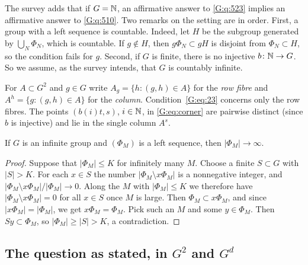 The survey adds that if $G=\mathbb{N}$, an affirmative answer to \cref{G:q:523} implies an
affirmative answer to \cref{G:q:510}. Two remarks on the setting are in order. First, a
group with a left \Fol{} sequence is countable. Indeed, let $H$ be the subgroup generated by
$\bigcup_N\Phi_N$, which is countable. If $g\notin H$, then $g\Phi_N\subset gH$ is disjoint
from $\Phi_N\subset H$, so the \Fol{} condition fails for $g$. Second, if $G$ is finite,
there is no injective $b\colon\mathbb{N}\to G$. So we assume, as the survey intends, that $G$ is
countably infinite.

For $A\subset G^2$ and $g\in G$ write $A_g=\{h:(g,h)\in A\}$ for the \emph{row fibre}
and $A^h=\{g:(g,h)\in A\}$ for the \emph{column}. Condition~\eqref{G:eq:23} concerns only
the row fibres. The points $(b(i)t,s)$, $i\in\mathbb{N}$, in \eqref{G:eq:corner} are pairwise
distinct (since $b$ is injective) and lie in the single column $A^s$.

\begin{lemma}\label{G:lem:folnergrow}
If $G$ is an infinite group and $(\Phi_M)$ is a left \Fol{} sequence, then
$|\Phi_M|\to\infty$.
\end{lemma}

\begin{proof}
Suppose that $|\Phi_M|\le K$ for infinitely many $M$. Choose a finite $S\subset G$ with
$|S|>K$. For each $x\in S$ the number $|\Phi_M\setminus x\Phi_M|$ is a nonnegative
integer, and $|\Phi_M\setminus x\Phi_M|/|\Phi_M|\to0$. Along the $M$ with $|\Phi_M|\le K$
we therefore have $|\Phi_M\setminus x\Phi_M|=0$ for all $x\in S$ once $M$ is large. Then
$\Phi_M\subset x\Phi_M$, and since $|x\Phi_M|=|\Phi_M|$, we get $x\Phi_M=\Phi_M$. Pick
such an $M$ and some $y\in\Phi_M$. Then $Sy\subset\Phi_M$, so $|\Phi_M|\ge|S|>K$, a
contradiction.
\end{proof}

\subsection{The question as stated, in \texorpdfstring{$G^2$}{G2} and
\texorpdfstring{$G^d$}{Gd}}

